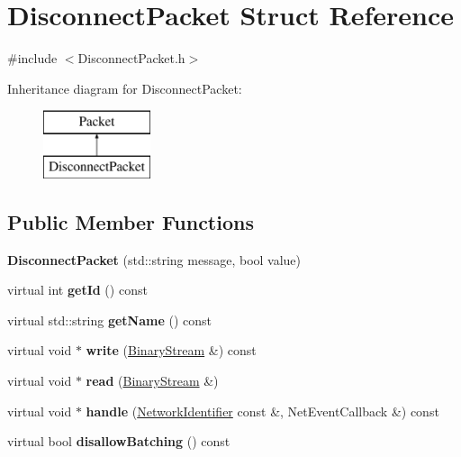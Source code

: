 \hypertarget{struct_disconnect_packet}{}\section{Disconnect\+Packet Struct Reference}
\label{struct_disconnect_packet}


{\ttfamily \#include $<$Disconnect\+Packet.\+h$>$}

Inheritance diagram for Disconnect\+Packet\+:\begin{figure}[H]
\begin{center}
\leavevmode
\includegraphics[height=2.000000cm]{struct_disconnect_packet}
\end{center}
\end{figure}
\subsection*{Public Member Functions}
\begin{DoxyCompactItemize}
\item 
\mbox{\label{struct_disconnect_packet_a48116574196d7ae53c4c9f4f5fef25ad}} 
{\bfseries Disconnect\+Packet} (std\+::string message, bool value)
\item 
\mbox{\label{struct_disconnect_packet_aec0eaff8d5e1e4bf65f9e8e2cffc222a}} 
virtual int {\bfseries get\+Id} () const
\item 
\mbox{\label{struct_disconnect_packet_a3461d85986ae0c4f90573041b0f1b4db}} 
virtual std\+::string {\bfseries get\+Name} () const
\item 
\mbox{\label{struct_disconnect_packet_aa048868ac4a38ae73539897e1d71481a}} 
virtual void $\ast$ {\bfseries write} (\mbox{\hyperlink{struct_binary_stream}{Binary\+Stream}} \&) const
\item 
\mbox{\label{struct_disconnect_packet_a23e497c5946b28fcb395654783732a2a}} 
virtual void $\ast$ {\bfseries read} (\mbox{\hyperlink{struct_binary_stream}{Binary\+Stream}} \&)
\item 
\mbox{\label{struct_disconnect_packet_ad9c14421ff0f9430ac32f6a8e871c46a}} 
virtual void $\ast$ {\bfseries handle} (\mbox{\hyperlink{struct_network_identifier}{Network\+Identifier}} const \&, Net\+Event\+Callback \&) const
\item 
\mbox{\label{struct_disconnect_packet_af96fc4e08367b6a8fbd2bc562f659953}} 
virtual bool {\bfseries disallow\+Batching} () const
\end{DoxyCompactItemize}
